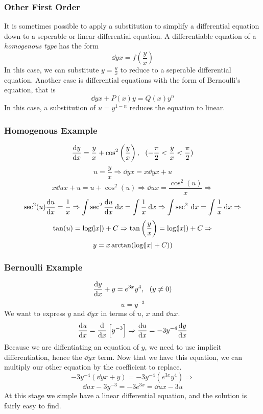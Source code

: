 \documentclass[12pt]{report}
\begin{document}
\begin{flushleft}
\subsubsection*{Other First Order}

It is sometimes possible to apply a substitution to simplify a differential
equation down to a seperable or linear differential equation. A differentiable
equation of a \textit{homogenous type} has the form
\[\dd{y}{x} = f\left(\frac{y}{x}\right)\]
In this case, we can substitute \(y = \frac{y}{x}\) to reduce to a seperable
differential equation. Another case is differential equations with the form
of Bernoulli's equation, that is
\[\dd{y}{x} + P(x)y = Q(x)y^n\]
In this case, a substitution of \(u = y^{1 - n}\) reduces the equation to 
linear.

\subsubsection*{Homogenous Example}

\[\frac{\mathrm{d}y}{\mathrm{d}x} = \frac{y}{x} + \cos^2\left(\frac{y}{x}\right)
, \:\:\: (-\frac{\pi}{2} < \frac{y}{x} < \frac{\pi}{2})\]
\[u = \frac{y}{x} \Rightarrow \dd{y}{x} = x\dd{y}{x} + u\]
\[x\dd{u}{x} + u = u + \cos^2(u) \Rightarrow \dd{u}{x} = \frac{\cos^2(u)}{x}
\Rightarrow\]
\[\sec^2(u)\frac{\mathrm{d}u}{\mathrm{d}x} = \frac{1}{x} \Rightarrow \int\sec^2\frac{\mathrm{d}u}{\mathrm{d}x}\:\mathrm{d}x 
= \int\frac{1}{x}\:\mathrm{d}x \Rightarrow \int\sec^2\:\mathrm{d}x = \int\frac{1}{x}\:\mathrm{d}x
\Rightarrow\]
\[\tan(u) = \log(\abs{x}) + C \Rightarrow \tan\left(\frac{y}{x}\right) 
= \log(\abs{x}) + C \Rightarrow\]
\[y = x\arctan(\log(\abs{x} + C))\]

\subsubsection*{Bernoulli Example}

\begin{center}
    \[\frac{\mathrm{d}y}{\mathrm{d}x} + y = e^{3x}y^4, \:\:\: (y\neq0)\]
    \[u = y^{-3}\]
    We want to express \(y\) and \(\dd{y}{x}\) in terms of \(u\), \(x\) and 
    \(\dd{u}{x}\).
    \[\frac{\mathrm{d}u}{\mathrm{d}x} = \frac{\mathrm{d}}{\mathrm{d}x}\left[y^{-3}\right] \Rightarrow \frac{\mathrm{d}u}{\mathrm{d}x} = -3y^{-4}\frac{\mathrm{d}y}{\mathrm{d}x}\]
    Because we are diffentiating an equation of \(y\), we need to use implicit
    differentiation, hence the \(\dd{y}{x}\) term. Now that we have this
    equation, we can multiply our other equation by the coefficient to replace.
    \[-3y^{-4}\left(\dd{y}{x} + y\right) = -3y^{-4}\left(e^{3x}y^4\right)
    \Rightarrow\]
    \[\dd{u}{x} - 3y^{-3} = -3e^{3x} = \dd{u}{x} -3u\]
    At this stage we simple have a linear differential equation, and the
    solution is fairly easy to find.
\end{center}


\end{flushleft}
\end{document}
